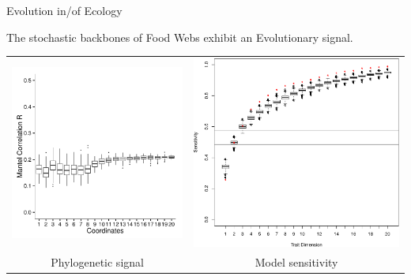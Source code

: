 \documentclass[]{beamer}
\begin{document}
\begin{frame}{Evolution in/of Ecology}

The stochastic backbones of Food Webs exhibit an Evolutionary signal.

\centering
\begin{tabular}{cc}
\includegraphics[width=0.4\linewidth]{images/psig.pdf} & \includegraphics[width=0.4 \linewidth]{images/sens.pdf}\\
{\tiny Phylogenetic signal} & {\tiny Model sensitivity}
\end{tabular}



\end{frame}
\end{document}
